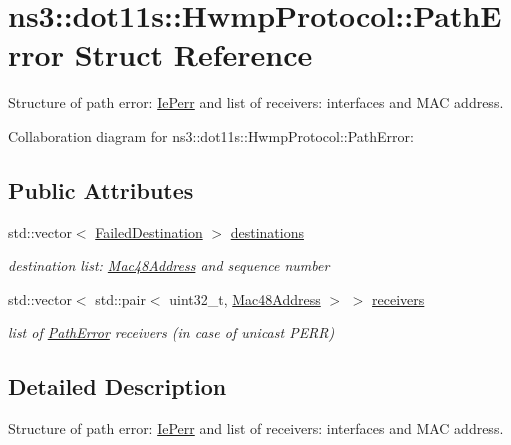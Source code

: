 \hypertarget{structns3_1_1dot11s_1_1HwmpProtocol_1_1PathError}{}\section{ns3\+:\+:dot11s\+:\+:Hwmp\+Protocol\+:\+:Path\+Error Struct Reference}
\label{structns3_1_1dot11s_1_1HwmpProtocol_1_1PathError}


Structure of path error\+: \hyperlink{classns3_1_1dot11s_1_1IePerr}{Ie\+Perr} and list of receivers\+: interfaces and M\+AC address.  




Collaboration diagram for ns3\+:\+:dot11s\+:\+:Hwmp\+Protocol\+:\+:Path\+Error\+:
\subsection*{Public Attributes}
\begin{DoxyCompactItemize}
\item 
std\+::vector$<$ \hyperlink{structns3_1_1dot11s_1_1HwmpProtocol_1_1FailedDestination}{Failed\+Destination} $>$ \hyperlink{structns3_1_1dot11s_1_1HwmpProtocol_1_1PathError_a3463ead3153e4a0cb3138e01257ca28a}{destinations}
\begin{DoxyCompactList}\small\item\em destination list\+: \hyperlink{classns3_1_1Mac48Address}{Mac48\+Address} and sequence number \end{DoxyCompactList}\item 
std\+::vector$<$ std\+::pair$<$ uint32\+\_\+t, \hyperlink{classns3_1_1Mac48Address}{Mac48\+Address} $>$ $>$ \hyperlink{structns3_1_1dot11s_1_1HwmpProtocol_1_1PathError_a7c6bbe47fe916cd4e4fb179243cf8ccb}{receivers}
\begin{DoxyCompactList}\small\item\em list of \hyperlink{structns3_1_1dot11s_1_1HwmpProtocol_1_1PathError}{Path\+Error} receivers (in case of unicast P\+E\+RR) \end{DoxyCompactList}\end{DoxyCompactItemize}


\subsection{Detailed Description}
Structure of path error\+: \hyperlink{classns3_1_1dot11s_1_1IePerr}{Ie\+Perr} and list of receivers\+: interfaces and M\+AC address. 

